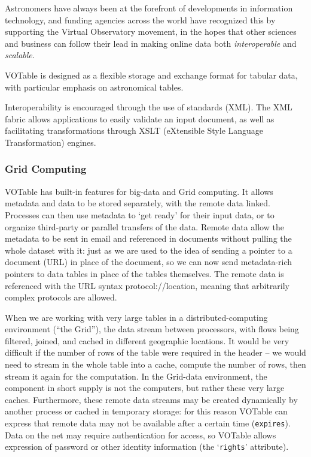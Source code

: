 \documentclass[11pt,a4paper]{ivoa}
\let\fg=\color
\def\attr#1{{\tt{\fg{DarkRed}#1}}}
\begin{document}
Astronomers have always been at the forefront of developments in
information technology, and funding agencies across the world have
recognized this by supporting the Virtual Observatory movement, in
the hopes that other sciences and business can follow their lead in
making online data both {\it interoperable} and {\it scalable}.

VOTable is designed as a flexible storage and exchange format for
tabular data, with particular emphasis on astronomical tables.

Interoperability is encouraged through the use of standards (XML).
The XML fabric
allows applications to easily validate an input document, as well as
facilitating transformations through XSLT (eXtensible Style Language
Transformation) engines.

\subsubsection*{Grid Computing}

VOTable has built-in features for big-data and Grid computing. It
allows metadata and data to be stored separately, with the remote
data linked. %
Processes can then use
metadata to `get ready' for their input data, or to organize
third-party or parallel transfers of the data. Remote data allow the
metadata to be sent in email and referenced in documents without
pulling the whole dataset with it: just as we are used to the idea of
sending a pointer to a document (URL) in place of the document, so we
can now send metadata-rich pointers to data tables in place of the
tables themselves. The remote data is referenced with the URL syntax
\textsf{protocol://location},
meaning that arbitrarily complex protocols are allowed.

When we are working with very large tables in a
distributed-computing environment (``the Grid''), the data
stream between processors, with flows being filtered, joined, and
cached in different geographic locations. It would be very difficult
if the number of rows of the table were required in the header --
we would need to stream in the whole table into a cache, compute the
number of rows, then stream it again for the computation. In the
Grid-data environment, the component in short supply is not the
computers, but rather these very large caches. Furthermore, these
remote data streams may be created dynamically by another process or
cached in temporary storage: for this reason VOTable can express that
remote data may not be available after a certain time (\attr{expires}).
Data on the net may require authentication for access, so VOTable
allows expression of password or other identity information (the
`{\attr{rights}}'
attribute).
\end{document}
